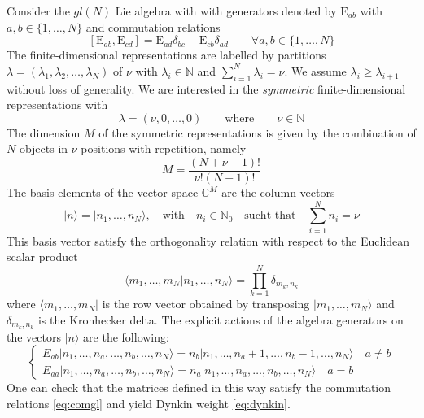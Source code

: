 \documentclass[11pt]{article}
\numberwithin{equation}{section}
\numberwithin{equation}{subsection}
\newcommand{\EE}{\mathrm{E}}
\newcommand{\twoj}{\nu}
\begin{document}
Consider the $gl(N)$ Lie algebra with with generators denoted by $\EE_{ab}$ with $a,b\in \{1,\ldots,N\}$ and commutation relations
\begin{equation}\label{eq:comgl}
\left[\EE_{ab},\EE_{cd}\right]=\EE_{ad}\delta_{bc}-\EE_{cb}\delta_{ad}\qquad \forall a,b\in \{1,\ldots,N\}
\end{equation}
The finite-dimensional representations are labelled by partitions $\lambda=(\lambda_1,\lambda_2,\ldots,\lambda_N)$ of $\nu$ with $\lambda_i\in \mathbb{N}$ and $\sum_{i=1}^N \lambda_i = \nu$. We assume $\lambda_i\geq \lambda_{i+1}$ without loss of generality.
We are interested in the {\em symmetric} finite-dimensional representations with 
\begin{equation}\label{eq:dynkin}
    \lambda=(\twoj,0,\ldots,0) \qquad\text{where}\qquad \twoj\in\mathbb{N}
\end{equation} 
The dimension $M$ of the symmetric representations is given by the combination of $N$ objects in $\twoj$ positions with repetition, namely
\begin{equation}
	M= \frac{(N+\twoj-1)!}{\twoj  !(N-1)!}
\end{equation} 
The basis elements of the vector space $\mathbb{C}^{M}$ are the column vectors 
\begin{equation}
  |n\rangle=  |n_{1},\ldots,n_{N}\rangle,\quad \text{with}\quad n_{i}\in\mathbb{N}_{0}\quad \text{sucht that}\quad \sum_{i=1}^{N}n_{i}=\nu
\end{equation}
This basis vector satisfy the orthogonality relation with respect to the Euclidean scalar product 
\begin{equation}\label{ortho}
    \langle m_{1},\ldots,m_{N}|n_{1},\ldots,n_{N}\rangle=\prod_{k=1}^{N}\delta_{m_{k},n_{k}}
\end{equation}
where  $ \langle m_{1},\ldots,m_{N}|$ is the row vector obtained by transposing $|m_{1},\ldots,m_{N}\rangle$ and $\delta_{m_{k},n_{k}}$ is the Kronhecker delta. 
The explicit actions of the algebra generators on the vectors $|n\rangle$ are the following:
\begin{equation}\label{actionE}
	\begin{cases}
		E_{ab}|n_{1},\ldots,n_{a},\ldots,n_{b},\ldots,n_{N}\rangle =n_{b}|n_{1},\ldots,n_{a}+1,\ldots,n_{b}-1,\ldots,n_{N}\rangle\quad a\neq b\\[0.1cm]
		E_{aa}|n_{1},\ldots,n_{a},\ldots,n_{b},\ldots,n_{N}\rangle = n_{a} |n_{1},\ldots,n_{a},\ldots,n_{b},\ldots,n_{N}\rangle\quad a=b
	\end{cases}
\end{equation}  
One can check that the matrices defined in this way satisfy the commutation relations \eqref{eq:comgl} and yield Dynkin weight \eqref{eq:dynkin}.
\end{document}
